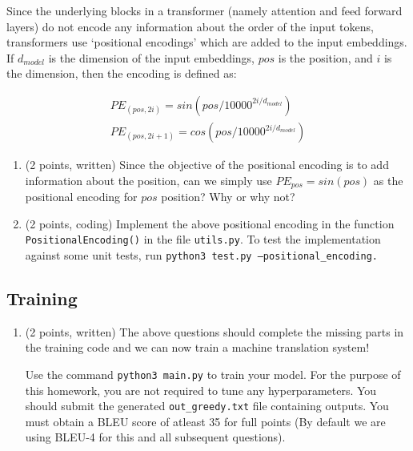 \documentclass{article}
\theoremstyle{case}
\theoremstyle{definition}
\begin{document}
Since the underlying blocks in a transformer (namely attention and feed forward layers) do not encode any information about the order of the input tokens, transformers use `positional encodings' which are added to the input embeddings. If $d_{model}$ is the dimension of the input embeddings, $pos$ is the position, and $i$ is the dimension, then the encoding is defined as:

\begin{align}
    PE_{(pos, 2i)} = sin(pos/10000^{2i/d_{model}})\\
    PE_{(pos, 2i+1)} = cos(pos/10000^{2i/d_{model}})
\end{align}

\begin{enumerate}
    \item (2 points, written) Since the objective of the positional encoding is to add information about the position, can we simply use $PE_{pos} = sin(pos)$ as the positional encoding for $pos$ position? Why or why not?


    \newpage
    \item (2 points, coding) Implement the above positional encoding in the function \texttt{PositionalEncoding()} in the file \texttt{utils.py}. To test the implementation against some unit tests, run \texttt{python3 test.py --positional\_encoding.}

    
\end{enumerate}


\newpage
\subsection{Training}\label{training_time}

\begin{enumerate}
    
    \item (2 points, written) The above questions should complete the missing parts in the training code and we can now train a machine translation system!
    
    Use the command \texttt{python3 main.py} to train your model. For the purpose of this homework, you are not required to tune any hyperparameters. You should submit the generated \texttt{out\_greedy.txt} file containing outputs. You must obtain a BLEU score of atleast 35 for full points (By default we are using BLEU-4 for this and all subsequent questions).

    
\end{enumerate}
\end{document}
